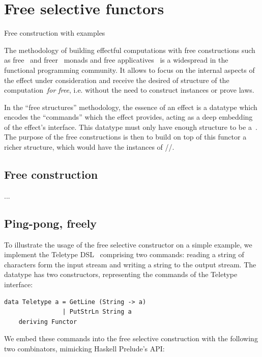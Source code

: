 \section{Free selective functors}\label{sec-free}

Free construction with examples

The methodology of building effectful computations with free constructions such
as free~\cite{free-monads} and freer~\cite{freer-monads} monads and free
applicatives~\cite{free-applicatives} is a widespread in the functional programming community.
It allows to focus on the internal aspects of the effect under consideration and receive the
desired  of  structure of the computation~\emph{for free},
i.e. without the need to construct instances or prove laws.

In the ``free structures'' methodology, the essence of an effect is a datatype which encodes
the ``commands'' which the effect provides, acting as a deep embedding of the effect's
interface. This datatype must only have enough structure to be a~. The purpose of
the free constructions is then to build on top of this functor a richer structure,
which would have the instances of //.

\subsection{Free construction}\label{sec-free-construction}

...

\subsection{Ping-pong, freely}\label{sec-free-ping-pong}

To illustrate the usage of the free selective constructor on a simple example, we implement the
Teletype DSL~\cite{swierstra2008data} comprising two commands: reading a string of characters
form the input stream and writing a string to the output stream. The  datatype
has two constructors, representing the commands of the Teletype interface:

\begin{verbatim}
data Teletype a = GetLine (String -> a)
                | PutStrLn String a
    deriving Functor
\end{verbatim}

We embed these commands into the free selective construction with the following two combinators,
mimicking Haskell Prelude's  API:

